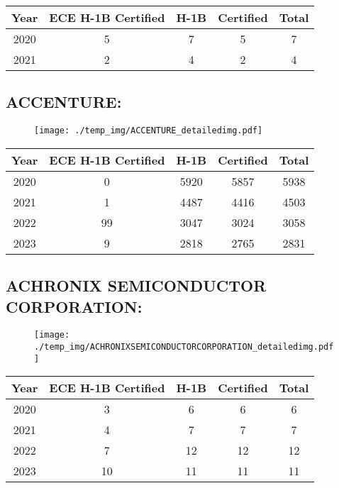 \documentclass{article}%
\begin{document}
%
\begin{longtable}{c|c|c|c|c}%
\hline%
Year&ECE H{-}1B Certified&H{-}1B&Certified&Total\\%
\hline%
2020&5&7&5&7\\%
\hline%
2021&2&4&2&4\\%
\hline%
\end{longtable}

%
\newpage%
\subsection{ACCENTURE:}%
\label{subsec:ACCENTURE}%
\label{ACCENTUREdetailed}%


\begin{figure}[htbp]%
\centering%
\texttt{[image: ./temp\_img/ACCENTURE\_detailedimg.pdf]}%
\end{figure}

%
\begin{longtable}{c|c|c|c|c}%
\hline%
Year&ECE H{-}1B Certified&H{-}1B&Certified&Total\\%
\hline%
2020&0&5920&5857&5938\\%
\hline%
2021&1&4487&4416&4503\\%
\hline%
2022&99&3047&3024&3058\\%
\hline%
2023&9&2818&2765&2831\\%
\hline%
\end{longtable}

%
\newpage%
\subsection{ACHRONIX SEMICONDUCTOR CORPORATION:}%
\label{subsec:ACHRONIXSEMICONDUCTORCORPORATION}%
\label{ACHRONIXSEMICONDUCTORCORPORATIONdetailed}%


\begin{figure}[htbp]%
\centering%
\texttt{[image: ./temp\_img/ACHRONIXSEMICONDUCTORCORPORATION\_detailedimg.pdf]}%
\end{figure}

%
\begin{longtable}{c|c|c|c|c}%
\hline%
Year&ECE H{-}1B Certified&H{-}1B&Certified&Total\\%
\hline%
2020&3&6&6&6\\%
\hline%
2021&4&7&7&7\\%
\hline%
2022&7&12&12&12\\%
\hline%
2023&10&11&11&11\\%
\hline%
\end{longtable}
\end{document}
